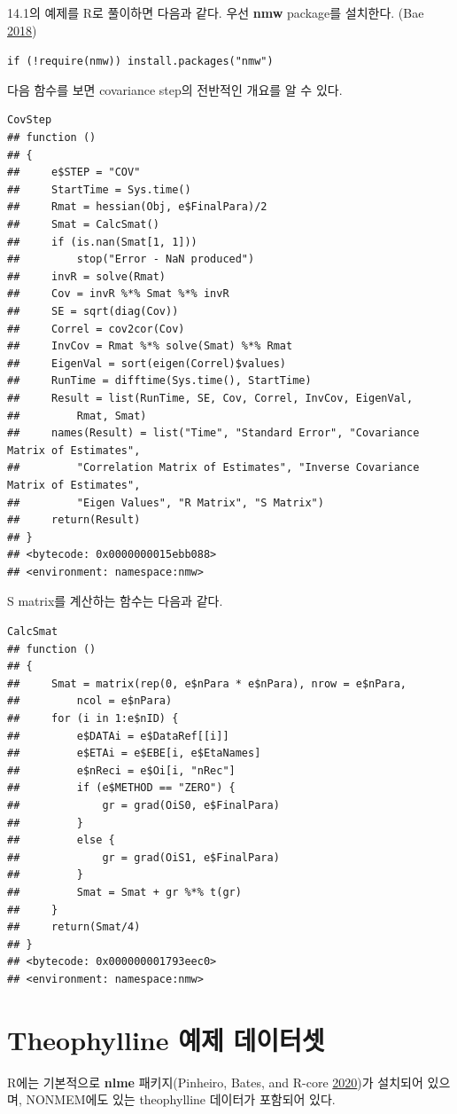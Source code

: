 \documentclass[
  10pt,
]{krantz}
\begin{document}
14.1의 예제를 R로 풀이하면 다음과 같다. 우선 \textbf{nmw} package를 설치한다. (Bae \protect\hyperlink{ref-R-nmw}{2018})

\texttt{if\ (!require(nmw))\ install.packages("nmw")}

다음 함수를 보면 covariance step의 전반적인 개요를 알 수 있다.

\begin{verbatim}
CovStep
## function () 
## {
##     e$STEP = "COV"
##     StartTime = Sys.time()
##     Rmat = hessian(Obj, e$FinalPara)/2
##     Smat = CalcSmat()
##     if (is.nan(Smat[1, 1])) 
##         stop("Error - NaN produced")
##     invR = solve(Rmat)
##     Cov = invR %*% Smat %*% invR
##     SE = sqrt(diag(Cov))
##     Correl = cov2cor(Cov)
##     InvCov = Rmat %*% solve(Smat) %*% Rmat
##     EigenVal = sort(eigen(Correl)$values)
##     RunTime = difftime(Sys.time(), StartTime)
##     Result = list(RunTime, SE, Cov, Correl, InvCov, EigenVal, 
##         Rmat, Smat)
##     names(Result) = list("Time", "Standard Error", "Covariance Matrix of Estimates", 
##         "Correlation Matrix of Estimates", "Inverse Covariance Matrix of Estimates", 
##         "Eigen Values", "R Matrix", "S Matrix")
##     return(Result)
## }
## <bytecode: 0x0000000015ebb088>
## <environment: namespace:nmw>
\end{verbatim}

S matrix를 계산하는 함수는 다음과 같다.

\begin{verbatim}
CalcSmat
## function () 
## {
##     Smat = matrix(rep(0, e$nPara * e$nPara), nrow = e$nPara, 
##         ncol = e$nPara)
##     for (i in 1:e$nID) {
##         e$DATAi = e$DataRef[[i]]
##         e$ETAi = e$EBE[i, e$EtaNames]
##         e$nReci = e$Oi[i, "nRec"]
##         if (e$METHOD == "ZERO") {
##             gr = grad(OiS0, e$FinalPara)
##         }
##         else {
##             gr = grad(OiS1, e$FinalPara)
##         }
##         Smat = Smat + gr %*% t(gr)
##     }
##     return(Smat/4)
## }
## <bytecode: 0x000000001793eec0>
## <environment: namespace:nmw>
\end{verbatim}

\hypertarget{theophylline-uxc608uxc81c-uxb370uxc774uxd130uxc14b}{%
\section{Theophylline 예제 데이터셋}\label{theophylline-uxc608uxc81c-uxb370uxc774uxd130uxc14b}}

R에는 기본적으로 \textbf{nlme} 패키지(Pinheiro, Bates, and R-core \protect\hyperlink{ref-R-nlme}{2020})가 설치되어 있으며, NONMEM에도 있는 theophylline 데이터가 포함되어 있다.
\end{document}
